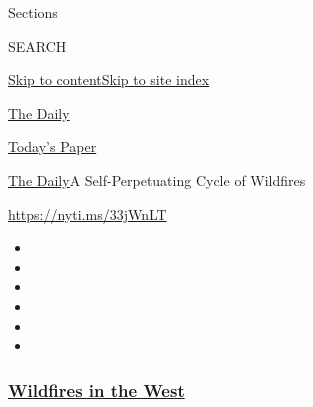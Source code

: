 Sections

SEARCH

\protect\hyperlink{site-content}{Skip to
content}\protect\hyperlink{site-index}{Skip to site index}

\href{https://www.nytimes3xbfgragh.onion/podcasts/the-daily}{The Daily}

\href{https://myaccount.nytimes3xbfgragh.onion/auth/login?response_type=cookie\&client_id=vi}{}

\href{https://www.nytimes3xbfgragh.onion/section/todayspaper}{Today's
Paper}

\href{/podcasts/the-daily}{The Daily}\textbar{}A Self-Perpetuating Cycle
of Wildfires

\url{https://nyti.ms/33jWnLT}

\begin{itemize}
\item
\item
\item
\item
\item
\item
\end{itemize}

\hypertarget{wildfires-in-the-west}{%
\subsubsection{\texorpdfstring{\href{https://www.nytimes3xbfgragh.onion/spotlight/california-wildfires?name=styln-california-wildfires\&region=TOP_BANNER\&block=storyline_menu_recirc\&action=click\&pgtype=Article\&impression_id=da837ab0-f52b-11ea-a2ac-3f128f7439bc\&variant=undefined}{Wildfires
in the West}}{Wildfires in the West}}\label{wildfires-in-the-west}}

